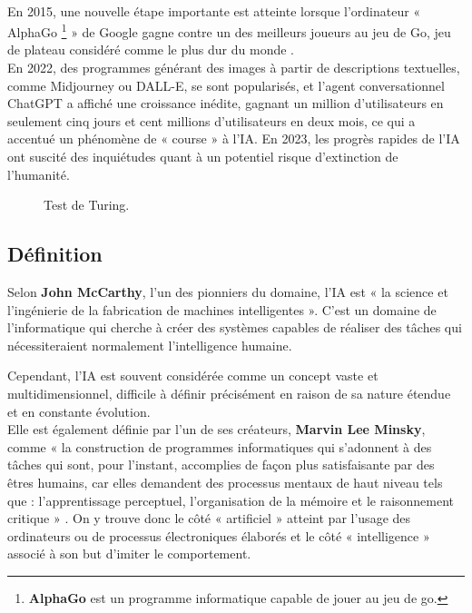 \\
En 2015, une nouvelle étape importante est atteinte lorsque l'ordinateur « AlphaGo\textsuperscript{} \footnote{\textbf{AlphaGo} est un programme informatique capable de jouer au jeu de go.} » de Google gagne contre un des meilleurs joueurs au jeu de Go, jeu de plateau considéré comme le plus dur du monde \cite{wiki_ml}.
\\
En 2022, des programmes générant des images à partir de descriptions textuelles, comme Midjourney ou DALL-E, se sont popularisés, et l'agent conversationnel ChatGPT a affiché une croissance inédite, gagnant un million d'utilisateurs en seulement cinq jours et cent millions d'utilisateurs en deux mois, ce qui a accentué un phénomène de « course » à l'IA. En 2023, les progrès rapides de l'IA ont suscité des inquiétudes quant à un potentiel risque d'extinction de l'humanité.

\begin{figure}[H]%
    \center%
    \setlength{\fboxsep}{5pt}%
    \setlength{\fboxrule}{0.5pt}%
    \caption{Test de Turing.}%
\end{figure}

\subsection{Définition}
Selon \textbf{John McCarthy}, l’un des pionniers du domaine, l’IA est « la science et l’ingénierie de la fabrication de machines intelligentes ». C’est un domaine de l’informatique qui cherche à créer des systèmes capables de réaliser des tâches qui nécessiteraient normalement l’intelligence humaine.

Cependant, l’IA est souvent considérée comme un concept vaste et multidimensionnel, difficile à définir précisément en raison de sa nature étendue et en constante évolution.
\\
Elle est également définie par l'un de ses créateurs, \textbf{Marvin Lee Minsky}, comme « la construction de programmes informatiques qui s'adonnent à des tâches qui sont, pour l'instant, accomplies de façon plus satisfaisante par des êtres humains, car elles demandent des processus mentaux de haut niveau tels que : l'apprentissage perceptuel, l'organisation de la mémoire et le raisonnement critique » \cite{Lee}. On y trouve donc le côté « artificiel » atteint par l'usage des ordinateurs ou de processus électroniques élaborés et le côté « intelligence » associé à son but d'imiter le comportement.

